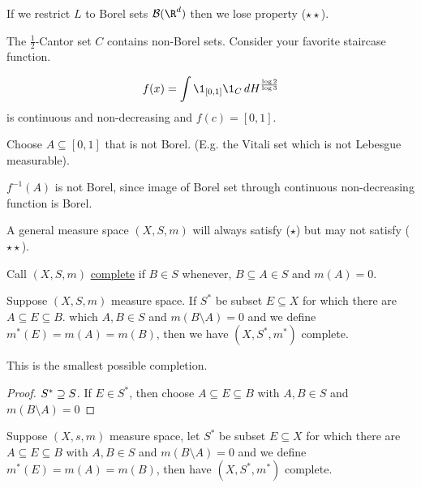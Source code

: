 \begin{remark}
	If we restrict $L$ to Borel sets $\B(\R^d)$ then we lose property ($\star \star$).
\end{remark}

\begin{example}
	The $\frac{1}{2}$-Cantor set $C$ contains non-Borel sets.
	Consider your favorite staircase function.

	\[
		f(x) = \int \1_{[0,1]}\1_{C} \, dH^{\frac{\log{2}}{\log{3}}}
	\]
	is continuous and non-decreasing and $f(c) = [0,1]$.
\end{example}

Choose $A \subseteq [0,1]$ that is not Borel. (E.g. the Vitali set which is not Lebesgue measurable).

$f^{-1} (A)$ is not Borel, since image of Borel set through continuous non-decreasing function is Borel.

\begin{remark}
	A general measure space $(X, S, m)$ will always satisfy ($\star$) but may not satisfy  ($\star \star$).
\end{remark}

\begin{definition}[Completeness]
	Call $(X,S,m)$ \underline{complete} if $B \in S$ whenever, $B \subseteq A \in S$ and $m(A) = 0$.
\end{definition}

\begin{theorem}
	Suppose $(X,S, m)$ measure space. If $S^*$ be subset $E \subseteq X$ for which there are $A \subseteq E \subseteq B$.
	which $A,B \in S$ and $m(B \setminus A) = 0$ and we define  $m^*(E) = m(A) = m(B)$, then we have $(X,S^*, m^*)$ complete.
\end{theorem}

\begin{remark}
	This is the smallest possible completion.
\end{remark}

\begin{proof}
	$S^* \supseteq S$. If $E \in S^*$, then choose $A \subseteq E \subseteq B$ with $A,B \in S$ and $m(B \setminus A) = 0$
\end{proof}

\begin{theorem}
	Suppose $(X,s, m)$ measure space, let $S^*$ be subset $E \subseteq X$ for which there are $A \subseteq E \subseteq B$ with
	$A, B \in S$ and $m(B \setminus A) = 0$ and we define  $m^*(E) = m(A) = m(B)$, then have $(X,S^*, m^*)$ complete.
\end{theorem}

